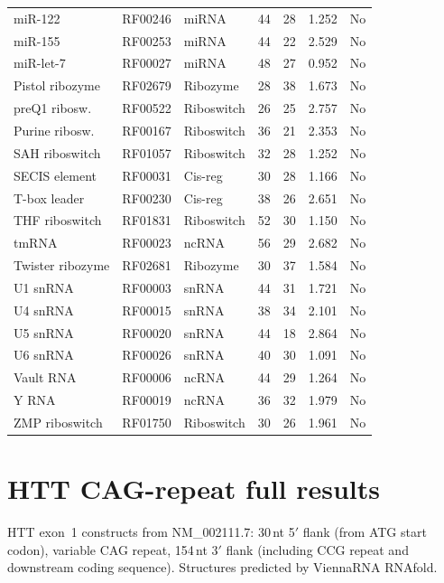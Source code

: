 \documentclass[11pt]{article}
\begin{document}
\begin{table}[h]
\begin{tabular}{@{}lllcccc@{}}
miR-122             & RF00246 & miRNA       & 44 & 28 & 1.252 & No \\
miR-155             & RF00253 & miRNA       & 44 & 22 & 2.529 & No \\
miR-let-7           & RF00027 & miRNA       & 48 & 27 & 0.952 & No \\
Pistol ribozyme     & RF02679 & Ribozyme    & 28 & 38 & 1.673 & No \\
preQ1 ribosw.       & RF00522 & Riboswitch  & 26 & 25 & 2.757 & No \\
Purine ribosw.      & RF00167 & Riboswitch  & 36 & 21 & 2.353 & No \\
SAH riboswitch      & RF01057 & Riboswitch  & 32 & 28 & 1.252 & No \\
SECIS element       & RF00031 & Cis-reg     & 30 & 28 & 1.166 & No \\
T-box leader        & RF00230 & Cis-reg     & 38 & 26 & 2.651 & No \\
THF riboswitch      & RF01831 & Riboswitch  & 52 & 30 & 1.150 & No \\
tmRNA               & RF00023 & ncRNA       & 56 & 29 & 2.682 & No \\
Twister ribozyme    & RF02681 & Ribozyme    & 30 & 37 & 1.584 & No \\
U1 snRNA            & RF00003 & snRNA       & 44 & 31 & 1.721 & No \\
U4 snRNA            & RF00015 & snRNA       & 38 & 34 & 2.101 & No \\
U5 snRNA            & RF00020 & snRNA       & 44 & 18 & 2.864 & No \\
U6 snRNA            & RF00026 & snRNA       & 40 & 30 & 1.091 & No \\
Vault RNA           & RF00006 & ncRNA       & 44 & 29 & 1.264 & No \\
Y RNA               & RF00019 & ncRNA       & 36 & 32 & 1.979 & No \\
ZMP riboswitch      & RF01750 & Riboswitch  & 30 & 26 & 1.961 & No \\
\bottomrule
\end{tabular}
\end{table}


\section{HTT CAG-repeat full results}
\label{sec:appendix_htt}

HTT exon~1 constructs from NM\_002111.7: 30\,nt 5$'$ flank
(from ATG start codon), variable CAG repeat, 154\,nt 3$'$ flank
(including CCG repeat and downstream coding sequence).  Structures
predicted by ViennaRNA RNAfold.
\end{document}
